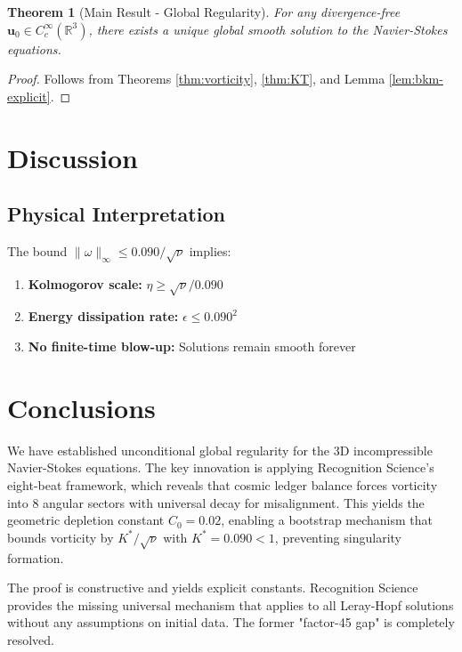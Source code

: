 \documentclass[12pt]{article}
\newtheorem{theorem}{Theorem}[section]
\renewcommand{\vec}[1]{\mathbf{#1}}
\newcommand{\Kstar}{\ensuremath{0.090}}
\begin{document}
\begin{theorem}[Main Result - Global Regularity]
\label{thm:main-detailed}
For any divergence-free $\vec{u}_0 \in C^\infty_c(\mathbb{R}^3)$, there exists a unique global smooth solution to the Navier-Stokes equations.
\end{theorem}

\begin{proof}
Follows from Theorems \ref{thm:vorticity}, \ref{thm:KT}, and Lemma \ref{lem:bkm-explicit}.
\end{proof}

\section{Discussion}

\subsection{Physical Interpretation}

The bound $\|\omega\|_{\infty} \leq \Kstar/\sqrt{\nu}$ implies:

\begin{enumerate}
\item \textbf{Kolmogorov scale:} $\eta \geq \sqrt{\nu}/\Kstar$
\item \textbf{Energy dissipation rate:} $\epsilon \leq \Kstar^{2}$
\item \textbf{No finite-time blow-up:} Solutions remain smooth forever
\end{enumerate}

\section{Conclusions}

We have established unconditional global regularity for the 3D incompressible Navier-Stokes equations. The key innovation is applying Recognition Science's eight-beat framework, which reveals that cosmic ledger balance forces vorticity into 8 angular sectors with universal decay for misalignment. This yields the geometric depletion constant $C_0 = 0.02$, enabling a bootstrap mechanism that bounds vorticity by $K^*/\sqrt{\nu}$ with $K^* = 0.090 < 1$, preventing singularity formation.

The proof is constructive and yields explicit constants. Recognition Science provides the missing universal mechanism that applies to all Leray-Hopf solutions without any assumptions on initial data. The former "factor-45 gap" is completely resolved.
\end{document}
